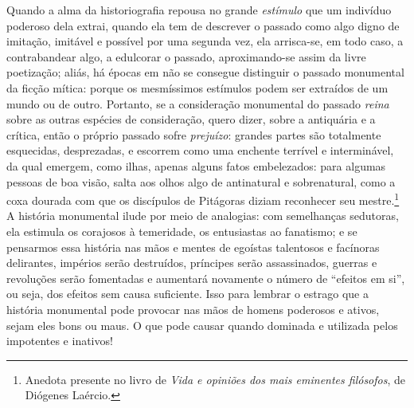 Quando a alma da historiografia repousa no grande \emph{estímulo} que um
indivíduo poderoso dela extrai, quando ela tem de descrever o passado
como algo digno de imitação, imitável e possível por uma segunda vez,
ela arrisca-se, em todo caso, a contrabandear algo, a edulcorar o
passado, aproximando-se assim da livre poetização; aliás, há épocas em
não se consegue distinguir o passado monumental da ficção mítica: porque
os mesmíssimos estímulos podem ser extraídos de um mundo ou de outro.
Portanto, se a consideração monumental do passado \emph{reina} sobre as
outras espécies de consideração, quero dizer, sobre a antiquária e a
crítica, então o próprio passado sofre \emph{prejuízo}: grandes partes
são totalmente esquecidas, desprezadas, e escorrem como uma enchente
terrível e interminável, da qual emergem, como ilhas, apenas alguns
fatos embelezados: para algumas pessoas de boa visão, salta aos olhos
algo de antinatural e sobrenatural, como a coxa dourada com que os
discípulos de Pitágoras diziam reconhecer seu mestre.\footnote{Anedota
  presente no livro  de \emph{Vida e opiniões dos mais eminentes
  filósofos}, de Diógenes Laércio.} A história monumental ilude por
meio de analogias: com semelhanças sedutoras, ela estimula os corajosos
à temeridade, os entusiastas ao fanatismo; e se pensarmos essa história
nas mãos e mentes de egoístas talentosos e facínoras delirantes,
impérios serão destruídos, príncipes serão assassinados, guerras e
revoluções serão fomentadas e aumentará novamente o número de ``efeitos
em si'', ou seja, dos efeitos sem causa suficiente. Isso para lembrar o
estrago que a história monumental pode provocar nas mãos de homens
poderosos e ativos, sejam eles bons ou maus. O que pode causar quando
dominada e utilizada pelos impotentes e inativos!

